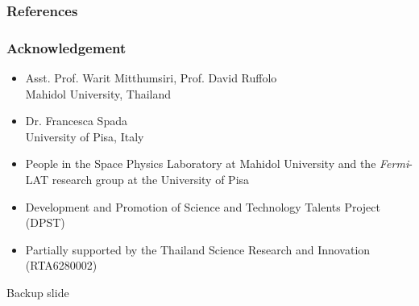 \documentclass{beamer}
\begin{document}
\begin{frame}
\frametitle{References}
\tiny


\end{frame}

\begin{frame}\frametitle{Acknowledgement}
  \begin{itemize}
    \item Asst. Prof. Warit Mitthumsiri, Prof. David Ruffolo \\ Mahidol University, Thailand
    \item Dr. Francesca Spada \\ University of Pisa, Italy
    \item People in the Space Physics Laboratory at Mahidol University and the \textit{Fermi}-LAT research group at the University of Pisa
    \item Development and Promotion of Science and Technology Talents Project (DPST)
    \item Partially supported by the Thailand Science Research and Innovation (RTA6280002)
  \end{itemize}
\end{frame}


\begin{frame}
\Huge{\centerline{Backup slide}}
\end{frame}
\end{document}
